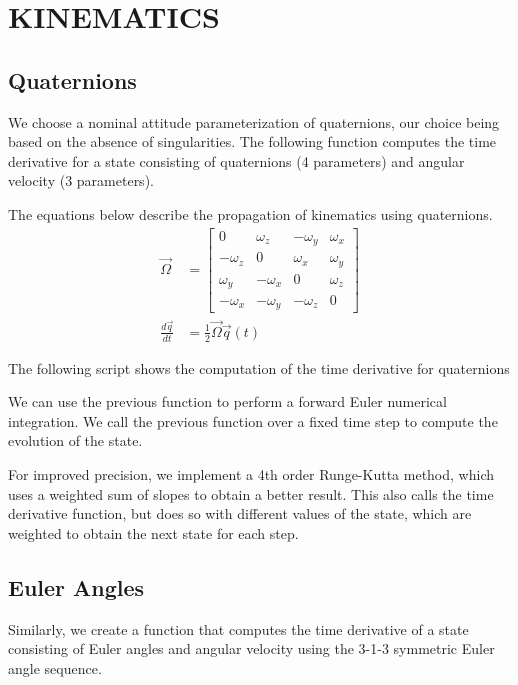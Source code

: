 \section{\Large KINEMATICS}
\subsection{Quaternions}
We choose a nominal attitude parameterization of quaternions, our choice being based on the absence of singularities. The following function computes the time derivative for a state consisting of quaternions (4 parameters) and angular velocity (3 parameters).

The equations below describe the propagation of kinematics using quaternions.
\begin{align*}
\Vec{\Omega} &= 
    \begin{bmatrix}
    0 & \omega_{z} & -\omega_{y} & \omega_{x}\\
    -\omega_{z} & 0 & \omega_{x} & \omega_{y}\\
    \omega_{y} & -\omega_{x} & 0 & \omega_{z}\\
    -\omega_{x} & -\omega_{y} & -\omega_{z} & 0
    \end{bmatrix}\\
\frac{d \Vec{q}}{dt} &= \frac{1}{2} \Vec{\Omega} \Vec{q}(t)
\end{align*}

The following script shows the computation of the time derivative for quaternions



We can use the previous function to perform a forward Euler numerical integration. We call the previous function over a fixed time step to compute the evolution of the state.



For improved precision, we implement a 4th order Runge-Kutta method, which uses a weighted sum of slopes to obtain a better result. This also calls the time derivative function, but does so with different values of the state, which are weighted to obtain the next state for each step.

\subsection{Euler Angles}
Similarly, we create a function that computes the time derivative of a state consisting of Euler angles and angular velocity using the 3-1-3 symmetric Euler angle sequence.

